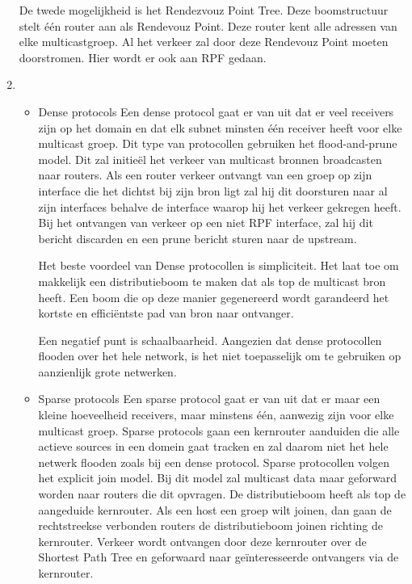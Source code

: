 \documentclass{report}
\begin{document}
\begin{enumerate}
De twede mogelijkheid is het Rendezvouz Point Tree. Deze boomstructuur stelt één router aan als Rendevouz Point. Deze router kent alle adressen van elke multicastgroep. Al het verkeer zal door deze Rendevouz Point moeten doorstromen. Hier wordt er ook aan RPF gedaan.

	\item 
		\begin{itemize}
			\item Dense protocols
			\newline
			Een dense protocol gaat er van uit dat er veel receivers zijn op het domain en dat elk subnet minsten één receiver heeft voor elke multicast groep. Dit type van protocollen gebruiken het flood-and-prune model. Dit zal initieël het verkeer van multicast bronnen broadcasten naar routers. Als een router verkeer ontvangt van een groep op zijn interface die het dichtst bij zijn bron ligt zal hij dit doorsturen naar al zijn interfaces behalve de interface waarop hij het verkeer gekregen heeft. Bij het ontvangen van verkeer op een niet RPF interface, zal hij dit bericht discarden en een prune bericht sturen naar de upstream.
			
			Het beste voordeel van Dense protocollen is simpliciteit. Het laat toe om makkelijk een distributieboom te maken dat als top de multicast bron heeft. Een boom die op deze manier gegenereerd wordt garandeerd het kortste en efficiëntste pad van bron naar ontvanger.
			
			Een negatief punt is schaalbaarheid. Aangezien dat dense protocollen flooden over het hele network, is het niet toepasselijk om te gebruiken op aanzienlijk grote netwerken.
			\item Sparse protocols
			\newline
			Een sparse protocol gaat er van uit dat er maar een kleine hoeveelheid receivers, maar minstens één, aanwezig zijn voor elke multicast groep. Sparse protocols gaan een kernrouter aanduiden die alle actieve sources in een domein gaat tracken en zal daarom niet het hele netwerk flooden zoals bij een dense protocol. Sparse protocollen volgen het explicit join model. Bij dit model zal multicast data maar geforward worden naar routers die dit opvragen. De distributieboom heeft als top de aangeduide kernrouter. Als een host een groep wilt joinen, dan gaan de rechtstreekse verbonden routers de distributieboom joinen richting de kernrouter. Verkeer wordt ontvangen door deze kernrouter over de Shortest Path Tree en geforwaard naar geïnteresseerde ontvangers via de kernrouter.
			

\end{itemize}
\end{enumerate}
\end{document}
